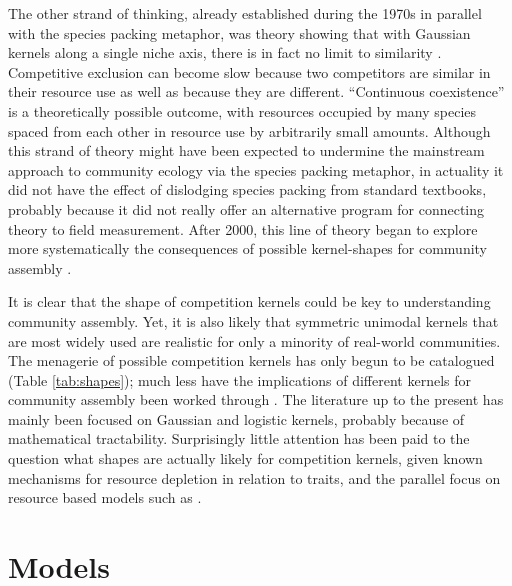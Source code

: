 \documentclass[a4paper,11pt]{article}
\begin{document}
The other strand of thinking, already established during the 1970s in
parallel with the species packing metaphor, was theory showing that
with Gaussian kernels along a single niche axis, there is in fact no
limit to similarity \citep{May-1972, Abrams-1975,
  Abrams-1983}. Competitive exclusion can become slow because two
competitors are similar in their resource use as well as because they
are different. ``Continuous coexistence'' is a theoretically possible
outcome, with resources occupied by many species spaced from each
other in resource use by arbitrarily small amounts.
Although this strand of theory might have been expected to undermine
the mainstream approach to community ecology via the species packing
metaphor, in actuality it did not have the effect of dislodging
species packing from standard textbooks, probably because it did not
really offer an alternative program for connecting theory to field
measurement.  After 2000, this line of theory began to explore more
systematically the consequences of possible kernel-shapes for
community assembly \citep{Scheffer-2006, Barabas-2013, Leimar-2013}.

It is clear that the shape of competition kernels 
could be key to
understanding community assembly. Yet, it is also likely that
symmetric unimodal kernels that are most widely used are realistic for only
a minority of
real-world communities. The menagerie of possible
competition
kernels has only begun to be catalogued (Table \ref{tab:shapes}); much
less have the implications of different kernels for community
assembly been worked through
\citep{Barabas-2012,Barabas-2013,DAndrea-2013,Leimar-2013}.  The
literature up to the present has mainly been focused on Gaussian and
logistic kernels, probably because of mathematical tractability.
Surprisingly little attention has been paid to the question what
shapes are actually likely for competition kernels, given known
mechanisms for resource depletion in relation to traits, and the
parallel focus on resource based models such as \Rstar.

\section{Models}
\end{document}
